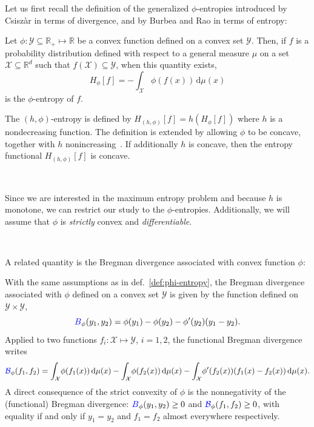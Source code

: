 \documentclass[entropy,article,submit,moreauthors,pdftex]{Definitions/mdpi}
\newcommand{\SZ}[1]{{\color{blue} #1}}                                       %
\def\dmu{\mathrm{d}\mu}%
\def\fB{\mathcal{B}}%
\def\Rset{\mathbb{R}}%
\def\X{\mathcal{X}}%
\def\Y{\mathcal{Y}}%
\begin{document}
Let  us  first  recall  the   definition  of  the  generalized  $\phi$-entropies
introduced by Csisz\`ar in terms of divergence,  and by Burbea and Rao in terms
of entropy:


\begin{Definition}
\label{def:phi-entropy}
  Let $\phi: \Y \subseteq \Rset_+ \mapsto \Rset$ be a convex function defined on
  a convex  set $\Y$.  Then, if  $f$ is a probability  distribution defined with
  respect to a general  measure $\mu$ on a set $\X  \subseteq \Rset^d$ such that
  $f(\X) \subseteq \Y$, when this quantity exists,
  \begin{equation}\label{eq:phi-entropy}
    H_{\phi}[f] = - \int_\X \phi(f(x)) \, \dmu(x)
  \end{equation}
  is  the $\phi$-entropy  of  $f$.
\end{Definition}
%
The $(h,\phi)$-entropy is defined by $H_{(h,\phi)}[f] = h\left(H_\phi[f]\right)$
where $h$ is  a nondecreasing function.  The definition is  extended by allowing
$\phi$  to be  concave, together  with $h$  nonincreasing~\cite{Csi67, SalMen93,
  Sal94, MenMor97,  Par06}.  If  additionally $h$ is  concave, then  the entropy
functional $H_{(h,\phi)}[f]$ is concave.

\

Since  we are  interested in  the  maximum entropy  problem and  because $h$  is
monotone, we can  restrict our study to the  $\phi$-entropies.  Additionally, we
will assume that $\phi$ is {\em strictly} convex and {\em differentiable}.

\

A related  quantity is  the Bregman divergence  associated with  convex function
$\phi$:

%
\begin{Definition}
\label{def:Bregman}
%
  With  the  same  assumptions  as in  def.~\ref{def:phi-entropy},  the  Bregman
  divergence associated with $\phi$ defined on a convex set $\Y$ is given by the
  function defined on $\Y \times \Y$,
  \begin{equation}\label{eq:Bregman}
    \SZ{B}_\phi(y_1,y_2) = \phi(y_1) - \phi(y_2) - \phi'(y_2) \left(y_1-y_2\right).
  \end{equation}
  Applied  to two  functions  $f_i: \X  \mapsto  \Y$, $i=1,  2$, the  functional
  Bregman divergence writes
  \begin{equation}
  \label{eq:FctBregman}
  \SZ{\fB}_\phi(f_1,f_2)  =  \int_\X   \!  \phi(f_1(x))  \,  \dmu(x)   -  \int_\X  \!
  \phi(f_2(x))  \, \dmu(x)  - \int_\X  \! \phi'(f_2(x))  \left( f_1(x)  - f_2(x)
  \right) \, \dmu(x).
  \end{equation}
  A direct consequence of the strict convexity of $\phi$ is the nonnegativity of
  the   (functional)   Bregman   divergence:   $\SZ{B}_\phi(y_1,y_2)   \ge   0$   and
  $\SZ{\fB}_\phi(f_1,f_2) \ge 0$, with equality if and only if $y_1 = y_2$ and $f_1 =
  f_2$ almost everywhere respectively.
\end{Definition}
\end{document}
